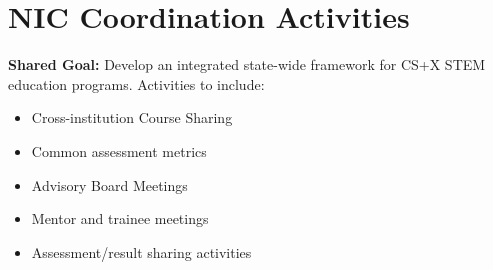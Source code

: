 \section{NIC Coordination Activities}
\textbf{Shared Goal:} Develop an integrated state-wide framework for CS+X STEM education programs.
Activities to include:
\begin{itemize}
    \item Cross-institution Course Sharing
    \item Common assessment metrics
    \item Advisory Board Meetings
    \item Mentor and trainee meetings
    \item Assessment/result sharing activities
\end{itemize}